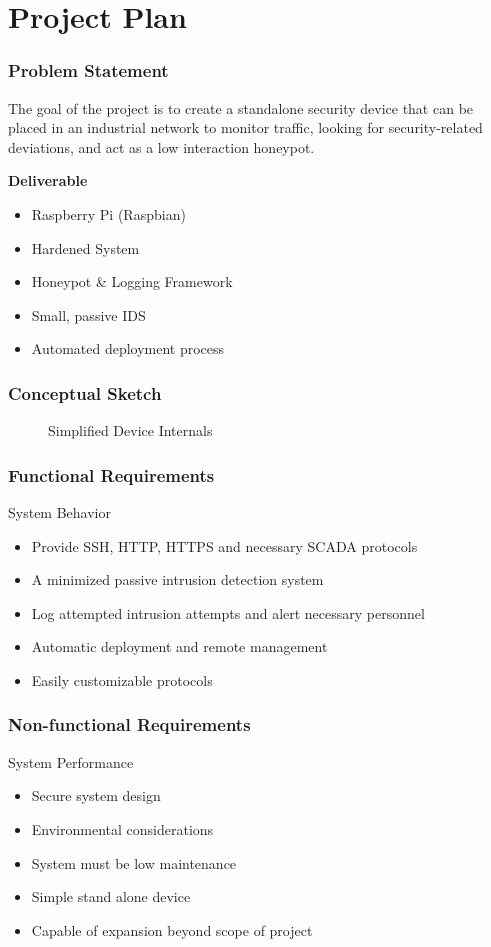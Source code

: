 \section{Project Plan}

\begin{frame}
\frametitle{Problem Statement}
The goal of the project is to create a standalone security device that can be placed in an industrial network to monitor traffic, looking for security-related deviations, and act as a low interaction honeypot.

\hfill

\textbf{Deliverable}
\begin{itemize}
\item Raspberry Pi (Raspbian)
\item Hardened System
\item Honeypot \& Logging Framework
\item Small, passive IDS
\item Automated deployment process
\end{itemize}

\end{frame}

\begin{frame}
\frametitle{Conceptual Sketch}
\begin{figure}
\centering
{
\scalebox{0.7}{}
}
\caption{Simplified Device Internals}
\end{figure}
\end{frame}

\begin{frame}
\frametitle{Functional Requirements}
System Behavior
\begin{itemize}
\item Provide SSH, HTTP, HTTPS and necessary SCADA protocols 
\item A minimized passive intrusion detection system
\item Log attempted intrusion attempts and alert necessary personnel 
\item Automatic deployment and remote management
\item Easily customizable protocols
\end{itemize}

\end{frame}

\begin{frame}
\frametitle{Non-functional Requirements}
System Performance
\begin{itemize}
\item Secure system design
\item Environmental considerations
\item System must be low maintenance
\item Simple stand alone device
\item Capable of expansion beyond scope of project
\end{itemize}

\end{frame}


